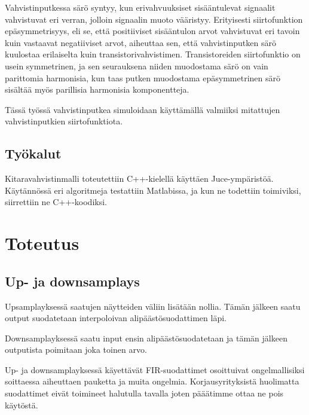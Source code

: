 \documentclass[11pt, a4paper, oneside]{article}
\begin{document}
Vahvistinputkessa särö syntyy, kun erivahvuuksiset sisääntulevat signaalit vahvistuvat eri verran, jolloin signaalin muoto vääristyy.
Erityisesti siirtofunktion epäsymmetrisyys, eli se, että positiiviset sisääntulon arvot vahvistuvat eri tavoin kuin vastaavat negatiiviset arvot, aiheuttaa sen, että vahvistinputken särö kuulostaa erilaiselta kuin transistorivahvistimen. 
Transistoreiden siirtofunktio on usein symmetrinen, ja sen seurauksena niiden muodostama särö on vain parittomia harmonisia, kun taas putken muodostama epäsymmetrinen särö sisältää myös parillisia harmonisia komponentteja. \cite{dafx}

Tässä työssä vahvistinputkea simuloidaan käyttämällä valmiiksi mitattujen vahvistinputkien siirtofunktiota. 

\subsection{Työkalut}

Kitaravahvistinmalli toteutettiin C++-kielellä käyttäen Juce-ympäristöä.
Käytännössä eri algoritmeja testattiin Matlabissa, ja kun ne todettiin toimiviksi, siirrettiin ne C++-koodiksi.  



\section{Toteutus}
 
 \subsection{Up- ja downsamplays}
 
 Upsamplayksessä saatujen näytteiden väliin lisätään nollia. Tämän jälkeen saatu output suodatetaan interpoloivan alipäästösuodattimen läpi.

Downsamplayksessä saatu input ensin alipäästösuodatetaan ja tämän jälkeen outputista poimitaan joka toinen arvo.

Up- ja downsamplayksessä käyettävät FIR-suodattimet osoittuivat ongelmallisiksi soittaessa aiheuttaen pauketta ja muita ongelmia. Korjausyrityksistä huolimatta suodattimet eivät toimineet halutulla tavalla joten pääätimme ottaa ne pois käytöstä. 


\end{document}
